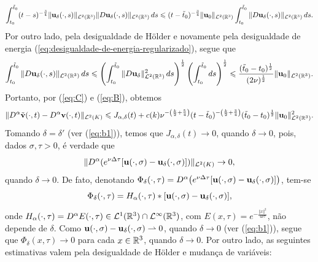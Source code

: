 \begin{prf}
    \begin{equation} \label{eq:C}
        \int_{t_0}^{\tilde t_0} (t-s)^{-\frac{3}{4}} \Vert \mathbf{u}_\delta(\cdot,s) \Vert_{\mathcal{L}^2(\mathbb{R}^3)} \Vert D\mathbf{u}_\delta(\cdot,s) \Vert_{\mathcal{L}^2(\mathbb{R}^3)} \,ds \leqslant (t - \tilde t_0)^{-\frac{3}{4}} \Vert \mathbf{u}_0 \Vert_{\mathcal{L}^2(\mathbb{R}^3)} \int_{t_0}^{\tilde t_0} \Vert D\mathbf{u}_\delta(\cdot,s) \Vert_{\mathcal{L}^2(\mathbb{R}^3)}\,ds.
    \end{equation}
    Por outro lado, pela desigualdade de Hölder e novamente pela desigualdade de energia (\ref{eq:desigualdade-de-energia-regularizado}), segue que
    \begin{equation} \label{eq:B}
        \int_{t_0}^{\tilde t_0} \Vert D\mathbf{u}_\delta(\cdot,s) \Vert_{\mathcal{L}^2(\mathbb{R}^3)}\,ds \leqslant \left( \int_{t_0}^{\tilde t_0} \Vert D\mathbf{u}_\delta \Vert^2_{\mathcal{L}^2(\mathbb{R}^3)} \,ds \right)^{\frac{1}{2}} \left( \int_{t_0}^{\tilde t_0} ds \right)^{\frac{1}{2}} \leqslant \frac{(\tilde t_0 - t_0)^{\frac{1}{2}}}{(2\nu)^{\frac{1}{2}}} \Vert \mathbf{u}_0 \Vert_{\mathcal{L}^2(\mathbb{R}^3)}.
    \end{equation}
    Portanto, por (\ref{eq:C}) e (\ref{eq:B}), obtemos
    \[
        \Vert D^\alpha\tilde{\mathbf{v}}(\cdot,t) -  D^\alpha\mathbf{v}(\cdot,t) \Vert_{\mathcal{L}^2(K)} \leqslant J_{\alpha,\delta}(t) + c(k) \nu^{-\left( \frac{k}{2} + \frac{5}{4} \right)}(t-\tilde t_0)^{-\left( \frac{k}{2} + \frac{3}{4} \right)} (\tilde t_0 - t_0)^{\frac{1}{2}} \Vert \mathbf{u}_0 \Vert_{\mathcal{L}^2(\mathbb{R}^3)}^2.
    \]
    Tomando $\delta = \delta'$ (ver (\ref{eq:b1})), temos que $J_{\alpha,\delta}(t)\to0$, quando $\delta \to 0$, pois, dados $\sigma,\tau >0$, é verdade que
    \begin{equation} \label{eq:Daendt}
        \Vert D^\alpha (e^{\nu\Delta\tau}[\mathbf{u}(\cdot,\sigma) -  \mathbf{u}_{\delta}(\cdot,\sigma)]) \Vert_{\mathcal{L}^2(K)} \to 0,
    \end{equation}
    quando $\delta \to 0$. De fato, denotando $\Phi_\delta(\cdot,\tau) = D^\alpha \big( e^{\nu \Delta \tau} [\mathbf{u}(\cdot,\sigma) - \mathbf{u}_\delta(\cdot,\sigma)] \big)$, tem-se
    \[
        \Phi_\delta(\cdot,\tau) =  H_\alpha(\cdot,\tau) * [\mathbf{u}(\cdot,\sigma) - \mathbf{u}_\delta(\cdot,\sigma)],
    \]
    onde $H_\alpha(\cdot,\tau) = D^\alpha E(\cdot,\tau) \in \mathcal{L}^1(\mathbb{R}^3) \cap \mathcal{L}^\infty(\mathbb{R}^3)$, com $E(x,\tau) = e^{-\frac{\Vert x \Vert^2}{4 \nu \tau}}$, não depende de $\delta$. Como $\mathbf{u}(\cdot,\sigma) - \mathbf{u}_{\delta}(\cdot,\sigma) \rightharpoonup 0$, quando $\delta \to 0$ (ver (\ref{eq:b1})), segue que $\Phi_{\delta}(x,\tau) \to 0$ para cada $x \in \mathbb{R}^3$, quando $\delta \to 0$.
    Por outro lado, as seguintes estimativas valem  pela desigualdade de Hölder e mudança de variáveis:

\end{prf}
